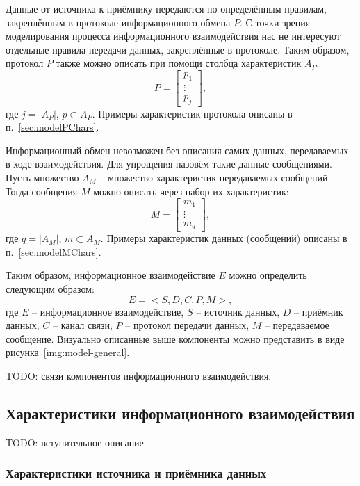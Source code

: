 Данные от источника к приёмнику передаются по определённым правилам, закреплённым в протоколе информационного обмена $P$.
С точки зрения моделирования процесса информационного взаимодействия нас не интересуют отдельные правила передачи данных, закреплённые в протоколе.
Таким образом, протокол $P$ также можно описать при помощи столбца характеристик $A_P$:
$$
P = \begin{bmatrix}
p_{1} \\
\vdots \\
p_{j}
\end{bmatrix},
$$
где $j = |A_P|$, $p \subset A_P$.
Примеры характеристик протокола описаны в п.~\ref{sec:modelPChars}.

Информационный обмен невозможен без описания самих данных, передаваемых в ходе взаимодействия.
Для упрощения назовём такие данные сообщениями.
Пусть множество $A_M$ -- множество характеристик передаваемых сообщений.
Тогда сообщения $M$ можно описать через набор их характеристик:
$$
M = \begin{bmatrix}
m_{1} \\
\vdots \\
m_{q}
\end{bmatrix},
$$
где $q = |A_M|$, $m \subset A_M$.
Примеры характеристик данных (сообщений) описаны в п.~\ref{sec:modelMChars}.

Таким образом, информационное взаимодействие $E$ можно определить следующим образом:
$$
E = <S,D,C,P,M>,
$$
где $E$ -- информационное взаимодействие, $S$ -- источник данных, $D$ -- приёмник данных, $C$ -- канал связи, $P$ -- протокол передачи данных, $M$ -- передаваемое сообщение.
Визуально описанные выше компоненты можно представить в виде рисунка~\ref{img:model-general}.


TODO: связи компонентов информационного взаимодействия.

\subsection{Характеристики информационного взаимодействия}

TODO: вступительное описание

\subsubsection{Характеристики источника и приёмника данных}
\label{sec:modelSDChars}


